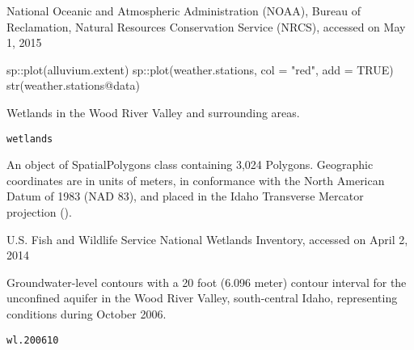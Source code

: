 \documentclass[a4paper]{book}
\begin{document}
%
\begin{Source}\relax
National Oceanic and Atmospheric Administration (NOAA),
Bureau of Reclamation, Natural Resources Conservation Service (NRCS),
accessed on May 1, 2015
\end{Source}
%
\begin{Examples}
\begin{ExampleCode}
sp::plot(alluvium.extent)
sp::plot(weather.stations, col = "red", add = TRUE)
str(weather.stations@data)

\end{ExampleCode}
\end{Examples}
%
\begin{Description}\relax
Wetlands in the Wood River Valley and surrounding areas.
\end{Description}
%
\begin{Usage}
\begin{verbatim}
wetlands
\end{verbatim}
\end{Usage}
%
\begin{Format}
An object of SpatialPolygons class containing 3,024 Polygons.
Geographic coordinates are in units of meters, in conformance with the
North American Datum of 1983 (NAD 83), and placed in the
Idaho Transverse Mercator projection ().
\end{Format}
%
\begin{Source}\relax
U.S. Fish and Wildlife Service National Wetlands Inventory,
accessed on April 2, 2014
\end{Source}
%
\begin{Examples}
\end{Examples}
%
\begin{Description}\relax
Groundwater-level contours with a 20 foot (6.096 meter) contour interval for the
unconfined aquifer in the Wood River Valley, south-central Idaho,
representing conditions during October 2006.
\end{Description}
%
\begin{Usage}
\begin{verbatim}
wl.200610
\end{verbatim}
\end{Usage}
\end{document}
